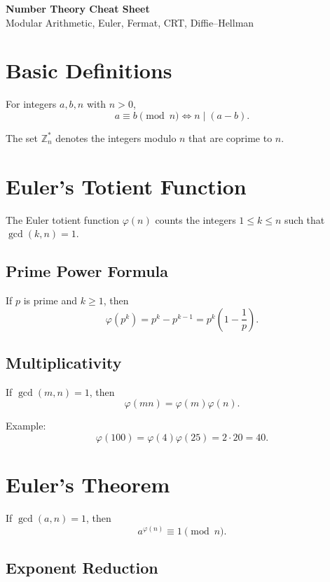 \documentclass[11pt]{article}
\begin{document}
	
	\begin{center}
		\Large\textbf{Number Theory Cheat Sheet}\\[0.5em]
		\normalsize Modular Arithmetic, Euler, Fermat, CRT, Diffie--Hellman
	\end{center}
	
	\section*{Basic Definitions}
	
	For integers $a,b,n$ with $n>0$,
	\[
	a \equiv b \pmod{n} \iff n \mid (a-b).
	\]
	
	The set $\mathbb{Z}_n^\ast$ denotes the integers modulo $n$ that are coprime to $n$.
	
	
	\section*{Euler's Totient Function}
	
	The Euler totient function $\varphi(n)$ counts the integers
	$1 \le k \le n$ such that $\gcd(k,n)=1$.
	
	\subsection*{Prime Power Formula}
	
	If $p$ is prime and $k \ge 1$, then
	\[
	\varphi(p^k) = p^k - p^{k-1} = p^k\left(1 - \frac{1}{p}\right).
	\]
	
	\subsection*{Multiplicativity}
	
	If $\gcd(m,n)=1$, then
	\[
	\varphi(mn) = \varphi(m)\varphi(n).
	\]
	
	Example:
	\[
	\varphi(100) = \varphi(4)\varphi(25) = 2 \cdot 20 = 40.
	\]
	
	\section*{Euler's Theorem}
	
	If $\gcd(a,n)=1$, then
	\[
	a^{\varphi(n)} \equiv 1 \pmod{n}.
	\]
	
	\subsection*{Exponent Reduction}
	
\end{document}
